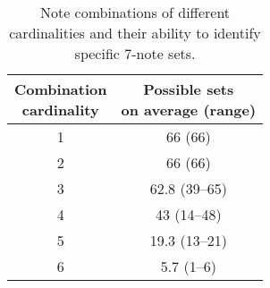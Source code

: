 \begin{table}[htbp]
\setlength{\tabcolsep}{4pt} %
\centering
\caption{Note combinations of different cardinalities and their ability to identify specific 7-note sets.}
\label{tab:comb-cardinality}
\begin{tabular}{c c}
\toprule
\makecell[c]{Combination\\cardinality} &
\makecell[c]{Possible sets\\on average (range)} \\
\midrule
1 & 66 (66) \\
2 & 66 (66) \\
3 & 62.8 (39--65) \\
4 & 43 (14--48) \\
5 & 19.3 (13--21) \\
6 & 5.7 (1--6) \\
\bottomrule
\end{tabular}
\end{table}